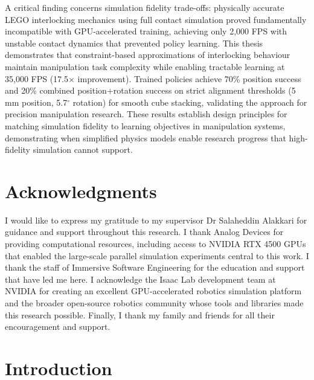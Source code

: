\documentclass[12pt,a4paper,oneside]{report}
\begin{document}
A critical finding concerns simulation fidelity trade-offs: physically accurate LEGO interlocking mechanics using full contact simulation proved fundamentally incompatible with GPU-accelerated training, achieving only 2,000 FPS with unstable contact dynamics that prevented policy learning. This thesis demonstrates that constraint-based approximations of interlocking behaviour maintain manipulation task complexity while enabling tractable learning at 35,000 FPS (17.5$\times$ improvement). Trained policies achieve 70\% position success and 20\% combined position+rotation success on strict alignment thresholds (5\,mm position, 5.7$^\circ$ rotation) for smooth cube stacking, validating the approach for precision manipulation research. These results establish design principles for matching simulation fidelity to learning objectives in manipulation systems, demonstrating when simplified physics models enable research progress that high-fidelity simulation cannot support.

\cleardoublepage

\chapter*{Acknowledgments}

I would like to express my gratitude to my supervisor Dr Salaheddin Alakkari for guidance and support throughout this research. I thank Analog Devices for providing computational resources, including access to NVIDIA RTX 4500 GPUs that enabled the large-scale parallel simulation experiments central to this work.
I thank the staff of Immersive Software Engineering for the education and support that have led me here.
I acknowledge the Isaac Lab development team at NVIDIA for creating an excellent GPU-accelerated robotics simulation platform and the broader open-source robotics community whose tools and libraries made this research possible.
Finally, I thank my family and friends for all their encouragement and support.

\cleardoublepage

\tableofcontents
\cleardoublepage

\listoffigures
\cleardoublepage


\chapter{Introduction}
\end{document}
